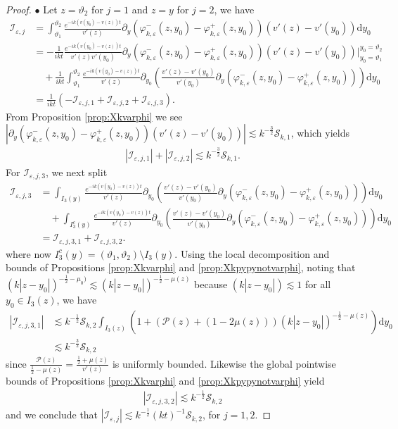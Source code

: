 \documentclass[10pt,a4paper]{amsart}
\newcommand\cI{{\mathcal I}}
\newcommand\cS{{\mathcal S}}
\newcommand{\bullpar}[1]{\vspace{.5em}\noindent $\bullet$ \normalfont {\bfseries #1.}}
\newcommand{\ep}{\varepsilon}
\renewcommand{\P}{{\mathcal{P}}}
\renewcommand{\d}{\mathrm{d}}
\begin{document}
\begin{proof}
\bullpar{Estimates for $\cI_{\ep,1}$ and $\cI_{\ep,2}$} Let $z=\vartheta_2$ for $j=1$ and $z=y$ for $j=2$, we have
\begin{align*}
\cI_{\ep,j} &= \int_{\vartheta_1}^{\vartheta_2} \frac{e^{-ik(v(y_0)-v(z)) t}}{v'(z)} \partial_y \left( \varphi_{k,\ep}^-(z,y_0) - \varphi_{k,\ep}^+(z,y_0) \right) (v'(z) - v'(y_0) ) \d y_0 \\
&= - \frac{1}{ikt} \frac{e^{-ik(v(y_0) - v(z))t}}{v'(z)v'(y_0)} \partial_y \left( \varphi_{k,\ep}^-(z,y_0) - \varphi_{k,\ep}^+(z,y_0) \right) (v'(z) - v'(y_0) ) \Big|_{y_0=\vartheta_1}^{y_0=\vartheta_2} \\
&\quad + \frac{1}{ikt}\int_{\vartheta_1}^{\vartheta_2}\frac{e^{-ik(v(y_0) - v(z))t}}{v'(z)} \partial_{y_0} \left( \frac{v'(z) - v'(y_0)}{v'(y_0)}\partial_y \left( \varphi_{k,\ep}^-(z,y_0) - \varphi_{k,\ep}^+(z,y_0) \right) \right) \d y_0 \\
&=\frac{1}{ikt}\left( -\cI_{\ep,j,1} + \cI_{\ep,j,2} + \cI_{\ep,j,3} \right).
\end{align*}
From Proposition \ref{prop:Xkvarphi} we see $\left| \partial_y \left( \varphi_{k,\ep}^-(z,y_0) - \varphi_{k,\ep}^+(z,y_0) \right) (v'(z) - v'(y_0) ) \right| \lesssim k^{-\frac32}\cS_{k,1}$, which yields
\begin{align*}
| \cI_{\ep,j,1} | + | \cI_{\ep,j,2} | \lesssim k^{-\frac32}\cS_{k,1}.
\end{align*}
For $\cI_{\ep,j,3}$, we next split
\begin{align*}
\cI_{\ep,j,3} &=\int_{I_3(y)}\frac{e^{-ik(v(y_0) - v(z))t}}{v'(z)} \partial_{y_0} \left( \frac{v'(z) - v'(y_0)}{v'(y_0)}\partial_y \left( \varphi_{k,\ep}^-(z,y_0) - \varphi_{k,\ep}^+(z,y_0) \right) \right) \d y_0 \\
&\quad + \int_{I_3^c(y)}\frac{e^{-ik(v(y_0) - v(z))t}}{v'(z)} \partial_{y_0} \left( \frac{v'(z) - v'(y_0)}{v'(y_0)}\partial_y \left( \varphi_{k,\ep}^-(z,y_0) - \varphi_{k,\ep}^+(z,y_0) \right) \right) \d y_0 \\
&= \cI_{\ep,j,3,1} + \cI_{\ep,j,3,2}.
\end{align*}
where now $I_3^c(y) = (\vartheta_1,\vartheta_2)\setminus I_3(y)$. Using the local decomposition and bounds of Propositions \ref{prop:Xkvarphi} and \ref{prop:Xkpypynotvarphi}, noting that $(k|z-y_0|)^{-\frac12-\mu_0)}\lesssim (k|z-y_0|)^{-\frac12-\mu(z)}$ because  $(k|z-y_0|)\lesssim 1$ for all  $y_0\in I_3(z)$,  we have
\begin{align*}
|\cI_{\ep,j,3,1}|&\lesssim k^{-\frac12}\cS_{k,2} \int_{I_3(z)} \left( 1 + \left( \P(z) + (1-2\mu(z)) \right)(k|z-y_0|)^{-\frac12-\mu(z)} \right) \d y_0 \\
&\lesssim k^{-\frac32}\cS_{k,2}
\end{align*}
since $\frac{\P(z)}{\frac12-\mu(z)} = \frac{\frac12+\mu(z)}{v'(z)}$ is uniformly bounded. Likewise the global pointwise bounds of Propositions \ref{prop:Xkvarphi} and \ref{prop:Xkpypynotvarphi} yield
\begin{align*}
|\cI_{\ep,j,3,2}| \lesssim k^{-\frac12}\cS_{k,2}
\end{align*}
and we conclude that $|\cI_{\ep,j}| \lesssim k^{-\frac12}(kt)^{-1}\cS_{k,2}$, for $j=1,2$.


\end{proof}
\end{document}
